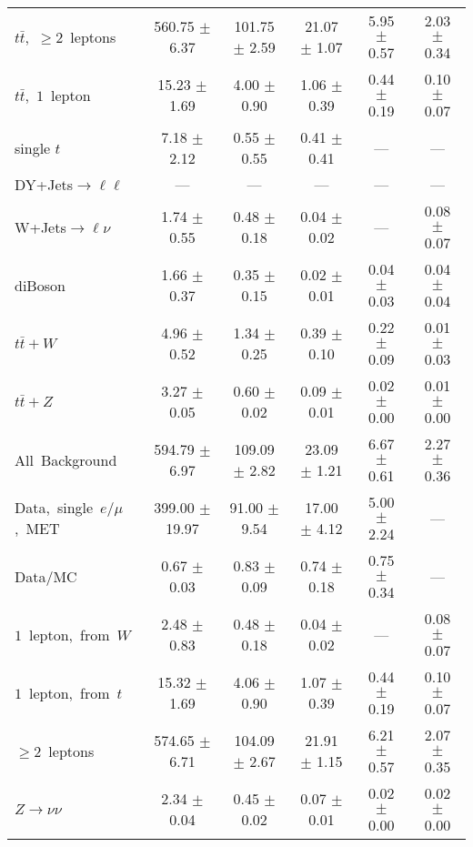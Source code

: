 \documentclass{article}
\begin{document}
\begin{longtable}{|l|c|c|c|c|c|}
$t\bar{t}$,~$\ge2$~leptons & 560.75 $\pm$ 6.37  & 101.75 $\pm$ 2.59  & 21.07 $\pm$ 1.07  & 5.95 $\pm$ 0.57  & 2.03 $\pm$ 0.34 \\* 
$t\bar{t}$,~$1$~lepton & 15.23 $\pm$ 1.69  & 4.00 $\pm$ 0.90  & 1.06 $\pm$ 0.39  & 0.44 $\pm$ 0.19  & 0.10 $\pm$ 0.07 \\* 
single $t$  & 7.18 $\pm$ 2.12  & 0.55 $\pm$ 0.55  & 0.41 $\pm$ 0.41  & ---  & --- \\* 
DY+Jets$\rightarrow\ell\ell$  & ---  & ---  & ---  & ---  & --- \\* 
W+Jets$\rightarrow\ell\nu$  & 1.74 $\pm$ 0.55  & 0.48 $\pm$ 0.18  & 0.04 $\pm$ 0.02  & ---  & 0.08 $\pm$ 0.07 \\* 
diBoson  & 1.66 $\pm$ 0.37  & 0.35 $\pm$ 0.15  & 0.02 $\pm$ 0.01  & 0.04 $\pm$ 0.03  & 0.04 $\pm$ 0.04 \\* 
$t\bar{t}+W$  & 4.96 $\pm$ 0.52  & 1.34 $\pm$ 0.25  & 0.39 $\pm$ 0.10  & 0.22 $\pm$ 0.09  & 0.01 $\pm$ 0.03 \\* 
$t\bar{t}+Z$  & 3.27 $\pm$ 0.05  & 0.60 $\pm$ 0.02  & 0.09 $\pm$ 0.01  & 0.02 $\pm$ 0.00  & 0.01 $\pm$ 0.00 \\* 
\hline \hline 
All~Background  & 594.79 $\pm$ 6.97  & 109.09 $\pm$ 2.82  & 23.09 $\pm$ 1.21  & 6.67 $\pm$ 0.61  & 2.27 $\pm$ 0.36 \\* 
Data,~single~$e/\mu$,~MET  & 399.00 $\pm$ 19.97  & 91.00 $\pm$ 9.54  & 17.00 $\pm$ 4.12  & 5.00 $\pm$ 2.24  & --- \\* 
Data/MC  & 0.67 $\pm$ 0.03  & 0.83 $\pm$ 0.09  & 0.74 $\pm$ 0.18  & 0.75 $\pm$ 0.34  & --- \\* 
\hline \hline 
$1$~lepton,~from~$W$  & 2.48 $\pm$ 0.83  & 0.48 $\pm$ 0.18  & 0.04 $\pm$ 0.02  & ---  & 0.08 $\pm$ 0.07 \\* 
$1$~lepton,~from~$t$  & 15.32 $\pm$ 1.69  & 4.06 $\pm$ 0.90  & 1.07 $\pm$ 0.39  & 0.44 $\pm$ 0.19  & 0.10 $\pm$ 0.07 \\* 
$\ge2$~leptons  & 574.65 $\pm$ 6.71  & 104.09 $\pm$ 2.67  & 21.91 $\pm$ 1.15  & 6.21 $\pm$ 0.57  & 2.07 $\pm$ 0.35 \\* 
$Z\rightarrow\nu\nu$  & 2.34 $\pm$ 0.04  & 0.45 $\pm$ 0.02  & 0.07 $\pm$ 0.01  & 0.02 $\pm$ 0.00  & 0.02 $\pm$ 0.00 \\* 
\hline 
\end{longtable} 

 
 
 
 
\pagebreak 

 
 
 
 
\end{document}
